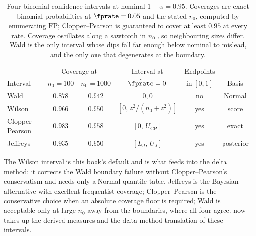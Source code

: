\begin{table}[ht]
\centering
\small
\setlength{\tabcolsep}{4pt}
\begin{tabular}{lccccc}
\hline
 & \multicolumn{2}{c}{Coverage at} & Interval at & Endpoints & \\
Interval & $n_0 = 100$ & $n_0 = 1000$ & $\hat{\fprate} = 0$ & in $[0, 1]$ & Basis \\
\hline
Wald             & $0.878$ & $0.942$ & $[0, 0]$                   & no  & Normal \\
Wilson           & $0.966$ & $0.950$ & $[0,\, z^2/(n_0 + z^2)]$   & yes & score \\
Clopper--Pearson & $0.983$ & $0.958$ & $[0,\, U_{\mathrm{CP}}]$   & yes & exact \\
Jeffreys         & $0.935$ & $0.950$ & $[L_J,\, U_J]$             & yes & posterior \\
\hline
\end{tabular}
\caption{Four binomial confidence intervals at nominal $1 - \alpha = 0.95$.
Coverages are exact binomial probabilities at $\fprate = 0.05$ and the
stated $n_0$, computed by enumerating $\mathrm{FP}$; Clopper--Pearson is guaranteed to
cover at least $0.95$ at every rate. Coverage oscillates along a sawtooth in
$n_0$ \parencite{brown-cai-dasgupta-2001}, so neighbouring sizes differ. Wald
is the only interval whose dips fall far enough below nominal to mislead, and
the only one that degenerates at the boundary.}
\label{tab:ci-comparison}
\end{table}

The Wilson interval is this book's default and is what 
feeds into the delta method: it corrects the Wald boundary failure without
Clopper--Pearson's conservatism and needs only a Normal-quantile table.
Jeffreys is the Bayesian alternative with excellent frequentist coverage;
Clopper--Pearson is the conservative choice when an absolute coverage floor is
required; Wald is acceptable only at large $n_0$ away from the boundaries,
where all four agree.  now takes up the derived
measures and the delta-method translation of these intervals.
